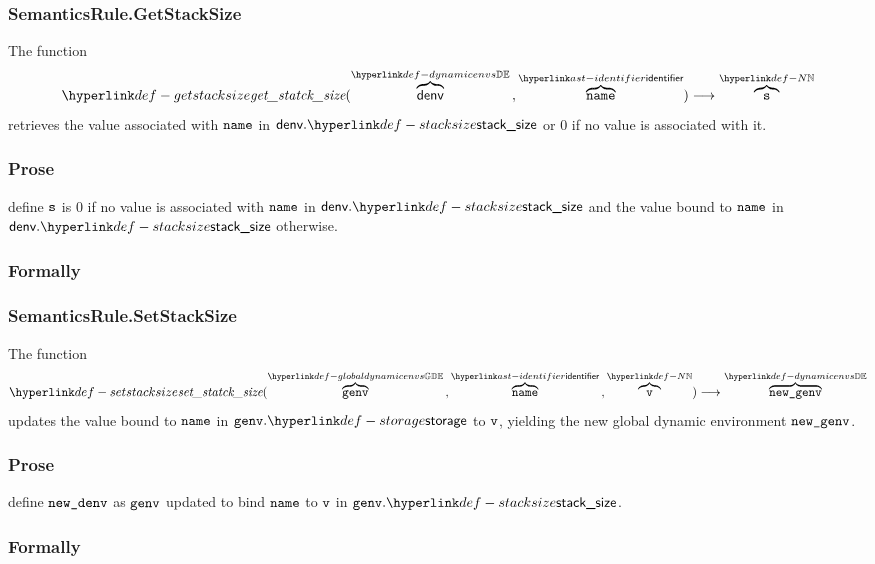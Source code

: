\subsubsection{SemanticsRule.GetStackSize\label{sec:SemanticsRule.GetStackSize}}
\hypertarget{def-getstacksize}{}
The function
\[
\getstacksize(\overname{\denv}{\dynamicenvs} \aslsep \overname{\name}{\identifier}) \aslto \overname{\vs}{\N}
\]
retrieves the value associated with $\name$ in $\denv.\stacksize$ or $0$ if no value is associated with it.

\subsubsection{Prose}
define $\vs$ is $0$ if no value is associated with $\name$ in $\denv.\stacksize$ and the value bound to
$\name$ in $\denv.\stacksize$ otherwise.

\subsubsection{Formally}
\begin{mathpar}
\end{mathpar}

\subsubsection{SemanticsRule.SetStackSize\label{sec:SemanticsRule.SetStackSize}}
\hypertarget{def-setstacksize}{}
The function
\[
\setstacksize(\overname{\genv}{\globaldynamicenvs} \aslsep \overname{\name}{\identifier} \aslsep \overname{\vv}{\N}) \aslto
\overname{\newgenv}{\dynamicenvs}
\]
updates the value bound to $\name$ in $\genv.\storage$ to $\vv$, yielding the new global dynamic environment $\newgenv$.

\subsubsection{Prose}
define $\newdenv$ as $\genv$ updated to bind $\name$ to $\vv$ in $\genv.\stacksize$.

\subsubsection{Formally}
\begin{mathpar}
\end{mathpar}

